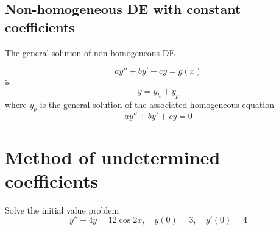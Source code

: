 \subsection{Non-homogeneous DE with constant coefficients}

The general solution of non-homogeneous DE

\begin{equation}
    ay'' + by' + cy = g(x)
\end{equation}
is 
\begin{equation}
    y = y_h + y_p
\end{equation}
where $y_p$ is the general solution of the associated homogeneous equation 
\begin{equation}
    ay'' + by' + cy = 0
\end{equation}

\section{Method of undetermined coefficients}

\begin{example}
    Solve the initial value problem
    \[
        y'' + 4y = 12 \cos 2x, \quad y(0) = 3,\quad y'(0) = 4
    \]
\end{example}

